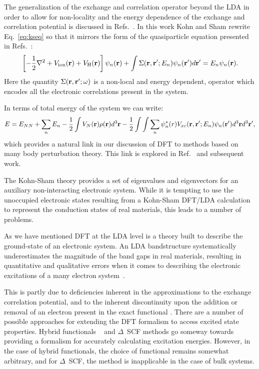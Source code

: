 The generalization of the exchange and correlation operator beyond the LDA 
in order to allow for non-locality and the energy dependence of the exchange and
correlation potential is discussed in Refs.~\cite{shamkohn66}. 
In this work Kohn and Sham rewrite Eq.~\ref{eq:kseq} so that it mirrors the form
of the quasiparticle equation presented in Refs.~\cite{schwinger51, hedin65}:
%
\begin{equation}
\label{eq:qpeq}
\left[-\frac{1}{2}\nabla^{2} + V_{\rm{ion}}({\bf r}) + V_{\rm{H}}({\bf r})\right]\psi_{n}({\bf r}) + \int \Sigma({\bf r},{\bf r}';E_{n})\psi_{n}({\bf r}') d{\bf r}' = E_{n}\psi_{n}({\bf r}).
\end{equation}
%
Here the quantity $\Sigma({\bf r},{\bf r}';\omega)$ is a non-local and energy dependent,
operator which encodes all the electronic correlations present in the system. 

In terms of total energy of the system we can write:
%
\begin{equation}
\label{eq:shamschlut}
E = E_{NN} + \sum_{n} E_{n} - \frac{1}{2}\int V_{N}({\bf r})\rho({\bf r})d^{3}{\bf r}
-\frac{1}{2}\int\int\sum_{n} \psi_{n}^{*}(r)V_{xc}({\bf r},{\bf r}';E_{n})\psi_{n}({\bf r}')d^{3}{\bf r} d^{3}{\bf r}',
\end{equation}
%
which provides a natural link in our discussion of DFT to methods
based on many body perturbation theory. This link is explored in Ref.~\cite{shamschlut83}
and subsequent work.

The Kohn-Sham theory provides a set of eigenvalues and eigenvectors for an auxiliary 
non-interacting electronic system. While it is tempting to use the unoccupied 
electronic states resulting from a Kohn-Sham DFT/LDA calculation to represent the
conduction states of real materials, this leads to a number of problems.

As we have mentioned DFT at the LDA level is a theory 
built to describe the ground-state of an electronic system.
An LDA bandstructure systematically underestimates the
magnitude of the band gaps in real materials,
resulting in quantitative and qualitative errors
when it comes to describing the electronic excitations 
of a many electron system~\cite{martin}.

This is partly due to deficiencies inherent in the approximations
to the exchange correlation potential, and to the
inherent discontinuity upon the addition or
removal of an electron present in the
exact functional \cite{perdew83, sham83, godby86}. There
are a number of possible approaches for extending the DFT
formalism to access excited state properties. Hybrid functionals
~\cite{rinke05, friedrich12} and $\Delta$~SCF methods \cite{gunnarsson76, jones89}
go someway towards providing a formalism for accurately calculating
excitation energies. However, in the case of hybrid functionals, the choice
of functional remains somewhat arbitrary, and for $\Delta$~SCF, the
method is inapplicable in the case of bulk systems.

